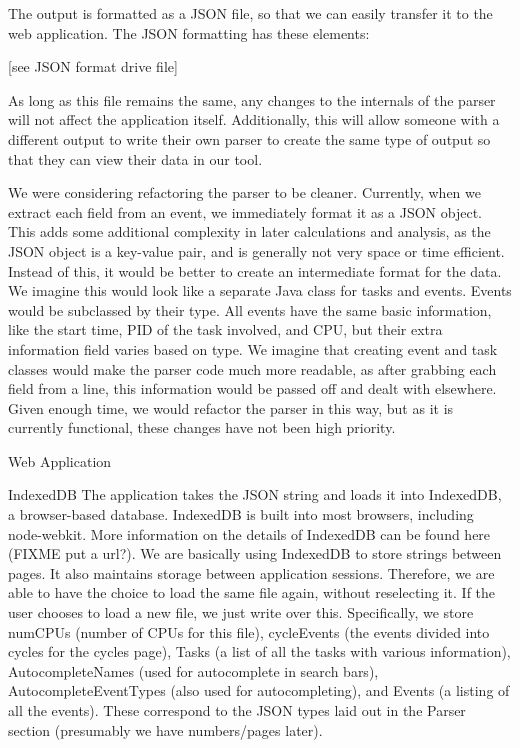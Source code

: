 \documentclass{hmcclinic}
\begin{document}
  The output is formatted as a JSON file, so that we can easily transfer it to the web application. The JSON formatting has these elements:

  [see JSON format drive file]

  As long as this file remains the same, any changes to the internals of the parser will not affect the application itself. Additionally, this will allow someone with a different output to write their own parser to create the same type of output so that they can view their data in our tool.

  We were considering refactoring the parser to be cleaner. Currently, when we extract each field from an event, we immediately format it as a JSON object. This adds some additional complexity in later calculations and analysis, as the JSON object is a key-value pair, and is generally not very space or time efficient. Instead of this, it would be better to create an intermediate format for the data. We imagine this would look like a separate Java class for tasks and events. Events would be subclassed by their type. All events have the same basic information, like the start time, PID of the task involved, and CPU, but their extra information field varies based on type. We imagine that creating event and task classes would make the parser code much more readable, as after grabbing each field from a line, this information would be passed off and dealt with elsewhere. Given enough time, we would refactor the parser in this way, but as it is currently functional, these changes have not been high priority.

  Web Application


  IndexedDB
  The application takes the JSON string and loads it into IndexedDB, a browser-based database. IndexedDB is built into most browsers, including node-webkit. More information on the details of IndexedDB can be found here (FIXME put a url?). We are basically using IndexedDB to store strings between pages. It also maintains storage between application sessions. Therefore, we are able to have the choice to load the same file again, without reselecting it. If the user chooses to load a new file, we just write over this. Specifically, we store numCPUs (number of CPUs for this file), cycleEvents (the events divided into cycles for the cycles page), Tasks (a list of all the tasks with various information), AutocompleteNames (used for autocomplete in search bars), AutocompleteEventTypes (also used for autocompleting), and Events (a listing of all the events). These correspond to the JSON types laid out in the Parser section (presumably we have numbers/pages later).
\end{document}
